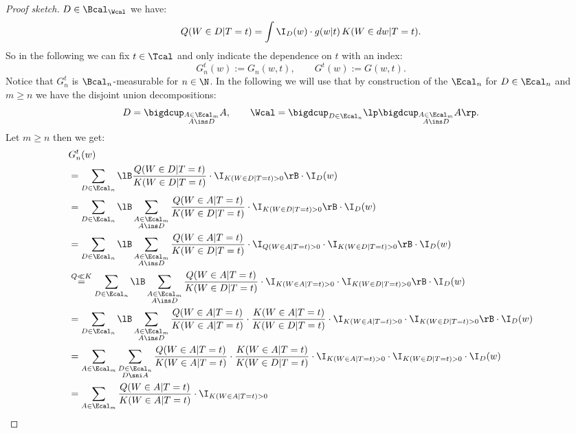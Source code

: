 \begin{Thm}
\begin{proof}[Proof sketch]
     $D \in \Bcal_\Wcal$ we have:
    \[ Q(W \in D|T=t) = \int \I_D(w) \cdot g(w|t) \, K(W \in dw|T=t). \]
     So in the following we can fix $t \in \Tcal$ and only indicate the dependence on $t$ with an index:
     \[  G_n^t(w):=G_n(w,t), \qquad G^t(w):=G(w,t).  \]
     Notice that $G_n^t$ is $\Bcal_n$-measurable for $n \in \N$.
     In the following we will use that by construction of the $\Ecal_n$ for $D \in \Ecal_n$ and $m \ge n$ we have the disjoint union decompositions:
     \[D = \bigdcup_{\substack{A \in \Ecal_m\\ A \ins D}} A, \qquad \Wcal = \bigdcup_{D \in \Ecal_n} \lp \bigdcup_{\substack{A \in \Ecal_m\\ A \ins D}} A \rp.\]
 Let $m \ge n$ then we get:
     \begin{align*}
        & G_n^t(w)\\ 
         & = \sum_{D \in \Ecal_n}  \lB \frac{Q(W \in D|T=t)}{K(W \in D|T=t)}  \cdot 
     \I_{K(W \in D|T=t)>0} \rB  \cdot \I_D(w)  \\
             & = \sum_{D \in \Ecal_n}  \lB \sum_{\substack{A \in \Ecal_{m}\\ A \ins D}}\frac{Q(W \in A|T=t)}{K(W \in D|T=t)}  \cdot \I_{K(W \in D|T=t)>0} \rB  \cdot \I_D(w)  \\
             & = \sum_{D \in \Ecal_n}  \lB \sum_{\substack{A \in \Ecal_{m}\\ A \ins D}}\frac{Q(W \in A|T=t)}{K(W \in D|T=t)}  \cdot \I_{Q(W \in A|T=t)>0} \cdot \I_{K(W \in D|T=t)>0}\rB  \cdot \I_D(w)  \\
             & \stackrel{Q \ll K}{=} \sum_{D \in \Ecal_n}  \lB \sum_{\substack{A \in \Ecal_{m}\\ A \ins D}}\frac{Q(W \in A|T=t)}{K(W \in D|T=t)}  \cdot \I_{K(W \in A|T=t)>0} \cdot \I_{K(W \in D|T=t)>0}\rB  \cdot \I_D(w)  \\
             &= \sum_{D \in \Ecal_n}  \lB \sum_{\substack{A \in \Ecal_{m}\\ A \ins D}}\frac{Q(W \in A|T=t)}{K(W \in A|T=t)}  \cdot\frac{K(W \in A|T=t)}{K(W \in D|T=t)}\cdot \I_{K(W \in A|T=t)>0}\cdot \I_{K(W \in D|T=t)>0} \rB  \cdot \I_D(w)  \\
             &= \sum_{A \in \Ecal_m}   \sum_{\substack{D \in \Ecal_n\\ D \sni A}}\frac{Q(W \in A|T=t)}{K(W \in A|T=t)}  \cdot\frac{K(W \in A|T=t)}{K(W \in D|T=t)}\cdot \I_{K(W \in A|T=t)>0}\cdot \I_{K(W \in D|T=t)>0}   \cdot \I_D(w)  \\
             &= \sum_{A \in \Ecal_m} \frac{Q(W \in A|T=t)}{K(W \in A|T=t)} \cdot  \I_{K(W \in A|T=t)>0}

\end{align*}
\end{proof}
\end{Thm}
